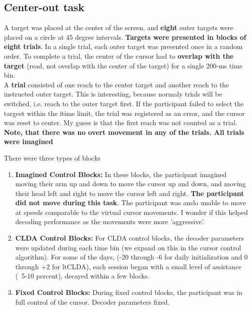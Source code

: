 \documentclass[11pt, a4paper, openany]{report}
\theoremstyle{definition}
\theoremstyle{remark}
\begin{document}
\subsection*{Center-out task}
A target was placed at the center of the screen, and \textbf{eight} outer targets were placed on a circle at 45 degree intervals. \textbf{Targets were presented in blocks of eight trials}. In a single trial, each outer target was presented once in a random order. To complete a trial, the center of the cursor had to \textbf{overlap with the target} (read, not overlap with the center of the target) for a single 200-ms time bin. \\

A \textbf{trial} consisted of one reach to the center target and another reach to the instructed outer target. This is interesting, because normaly trials will be switched, i.e. reach to the outer target first. If the participant failed to select the targeet within the itime limit, the trial was registered as an error, and the cursor was reset to center. My guess is that the first reach was not counted as a trial. \\

\textbf{Note, that there was no overt movement in any of the trials. All trials were imagined}

There were three types of blocks
\begin{enumerate}
    \item \textbf{Imagined Control Blocks:} In these blocks, the participant imagined moving their arm up and down to move the cursor up and down, and moving their head left and right to move the cursor left and right. \textbf{The participant did not move during this task}. The participant was anslo unable to move at speeds comparable to the virtual cursor movements. I wonder if this helped decoding performance as the movements were more 'aggressive'. 
    \item \textbf{CLDA Control Blocks:} For CLDA control blocks, the decoder parameters were updated during each time bin (we expand on this in the cursor control algorithm). For some of the days, (-20 through -6 for daily initialization and 0 through +2 for ltCLDA), each session began with a small level of assistance (~5-10 percent), decayed within a few blocks. 
    \item \textbf{Fixed Control Blocks:} During fixed control blocks, the participant was in full control of the cursor. Decoder parameters fixed. 
\end{enumerate}
\end{document}
